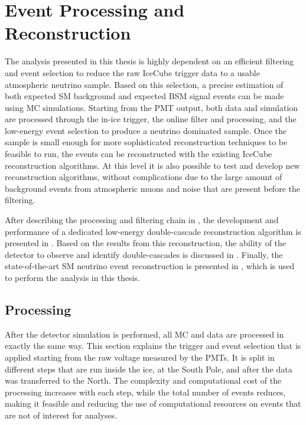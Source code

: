 \setchapterpreamble[u]{\margintoc}


\chapter{Event Processing and Reconstruction}

The analysis presented in this thesis is highly dependent on an efficient filtering and event selection to reduce the raw IceCube trigger data to a usable atmospheric neutrino sample. Based on this selection, a precise estimation of both expected SM background and expected BSM signal events can be made using MC simulations. Starting from the PMT output, both data and simulation are processed through the in-ice trigger, the online filter and processing, and the low-energy event selection to produce a neutrino dominated sample. Once the sample is small enough for more sophisticated reconstruction techniques to be feasible to run, the events can be reconstructed with the existing IceCube reconstruction algorithms. At this level it is also possible to test and develop new reconstruction algorithms, without complications due to the large amount of background events from atmospheric muons and noise that are present before the filtering.

After describing the processing and filtering chain in , the development and performance of a dedicated low-energy double-cascade reconstruction algorithm is presented in . Based on the results from this reconstruction, the ability of the detector to observe and identify double-cascades is discussed in . Finally, the state-of-the-art SM neutrino event reconstruction is presented in , which is used to perform the analysis in this thesis.


\section{Processing} 

After the detector simulation is performed, all MC and data are processed in exactly the same way. This section explains the trigger and event selection that is applied starting from the raw voltage measured by the PMTs. It is split in different steps that are run inside the ice, at the South Pole, and after the data was transferred to the North. The complexity and computational cost of the processing increases with each step, while the total number of events reduces, making it feasible and reducing the use of computational resources on events that are not of interest for analyses. 


